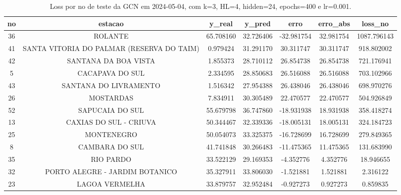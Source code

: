 \begin{table}[h]
\centering
\caption{Loss por no de teste da GCN em 2024-05-04, com k=3, HL=4, hidden=24, epochs=400 e lr=0.001.}
\label{tab:gcn_loss_k3_hl4_h24_e400_d20240504}
\begin{tabular}{ccccccc}
\toprule
no & estacao & y\_real & y\_pred & erro & erro\_abs & loss\_no \\
\midrule
36 & ROLANTE & 65.708160 & 32.726406 & -32.981754 & 32.981754 & 1087.796143 \\
41 & SANTA VITORIA DO PALMAR (RESERVA DO TAIM) & 0.979424 & 31.291170 & 30.311747 & 30.311747 & 918.802002 \\
42 & SANTANA DA BOA VISTA & 1.855373 & 28.710112 & 26.854738 & 26.854738 & 721.176941 \\
5 & CACAPAVA DO SUL & 2.334595 & 28.850683 & 26.516088 & 26.516088 & 703.102966 \\
43 & SANTANA DO LIVRAMENTO & 1.516342 & 27.954388 & 26.438046 & 26.438046 & 698.970276 \\
26 & MOSTARDAS & 7.834911 & 30.305489 & 22.470577 & 22.470577 & 504.926849 \\
52 & SAPUCAIA DO SUL & 55.679798 & 36.747860 & -18.931938 & 18.931938 & 358.418274 \\
13 & CAXIAS DO SUL - CRIUVA & 50.344467 & 32.339336 & -18.005131 & 18.005131 & 324.184723 \\
25 & MONTENEGRO & 50.054073 & 33.325375 & -16.728699 & 16.728699 & 279.849365 \\
8 & CAMBARA DO SUL & 41.741848 & 30.266483 & -11.475365 & 11.475365 & 131.683990 \\
35 & RIO PARDO & 33.522129 & 29.169353 & -4.352776 & 4.352776 & 18.946655 \\
32 & PORTO ALEGRE - JARDIM BOTANICO & 35.327911 & 33.806030 & -1.521881 & 1.521881 & 2.316122 \\
23 & LAGOA VERMELHA & 33.879757 & 32.952484 & -0.927273 & 0.927273 & 0.859835 \\
\bottomrule
\end{tabular}
\end{table}
